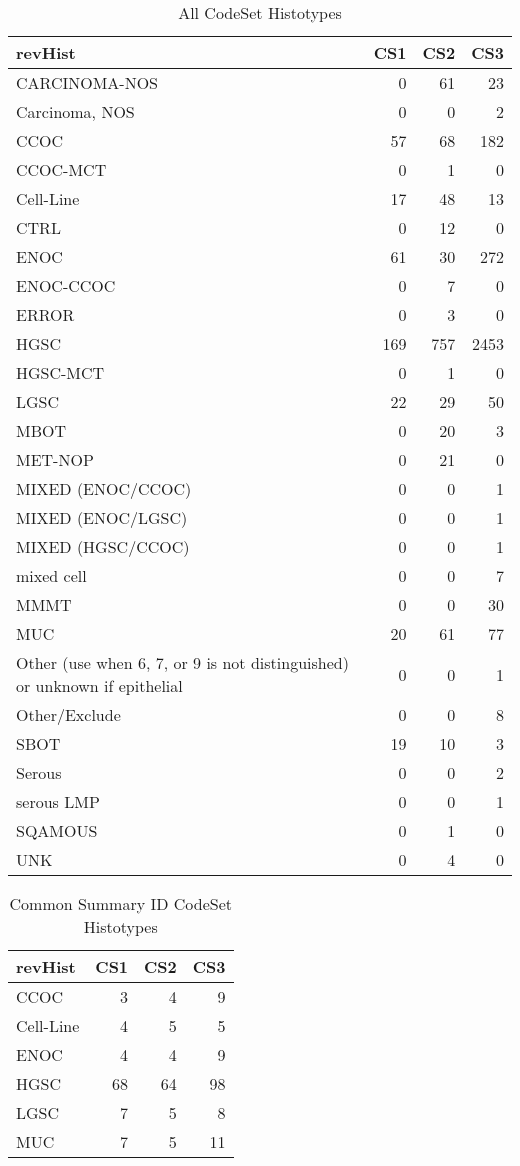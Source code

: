 \documentclass[
]{report}
\begin{document}
\begin{table}

\caption{\label{tab:dist-all}All CodeSet Histotypes}
\centering
\begin{tabular}[t]{l|r|r|r}
\hline
revHist & CS1 & CS2 & CS3\\
\hline
CARCINOMA-NOS & 0 & 61 & 23\\
\hline
Carcinoma, NOS & 0 & 0 & 2\\
\hline
CCOC & 57 & 68 & 182\\
\hline
CCOC-MCT & 0 & 1 & 0\\
\hline
Cell-Line & 17 & 48 & 13\\
\hline
CTRL & 0 & 12 & 0\\
\hline
ENOC & 61 & 30 & 272\\
\hline
ENOC-CCOC & 0 & 7 & 0\\
\hline
ERROR & 0 & 3 & 0\\
\hline
HGSC & 169 & 757 & 2453\\
\hline
HGSC-MCT & 0 & 1 & 0\\
\hline
LGSC & 22 & 29 & 50\\
\hline
MBOT & 0 & 20 & 3\\
\hline
MET-NOP & 0 & 21 & 0\\
\hline
MIXED (ENOC/CCOC) & 0 & 0 & 1\\
\hline
MIXED (ENOC/LGSC) & 0 & 0 & 1\\
\hline
MIXED (HGSC/CCOC) & 0 & 0 & 1\\
\hline
mixed cell & 0 & 0 & 7\\
\hline
MMMT & 0 & 0 & 30\\
\hline
MUC & 20 & 61 & 77\\
\hline
Other (use when 6, 7, or 9 is not distinguished) or unknown if epithelial & 0 & 0 & 1\\
\hline
Other/Exclude & 0 & 0 & 8\\
\hline
SBOT & 19 & 10 & 3\\
\hline
Serous & 0 & 0 & 2\\
\hline
serous LMP & 0 & 0 & 1\\
\hline
SQAMOUS & 0 & 1 & 0\\
\hline
UNK & 0 & 4 & 0\\
\hline
\end{tabular}
\end{table}

\begin{table}

\caption{\label{tab:dist-common}Common Summary ID CodeSet Histotypes}
\centering
\begin{tabular}[t]{l|r|r|r}
\hline
revHist & CS1 & CS2 & CS3\\
\hline
CCOC & 3 & 4 & 9\\
\hline
Cell-Line & 4 & 5 & 5\\
\hline
ENOC & 4 & 4 & 9\\
\hline
HGSC & 68 & 64 & 98\\
\hline
LGSC & 7 & 5 & 8\\
\hline
MUC & 7 & 5 & 11\\
\hline
\end{tabular}
\end{table}
\end{document}
